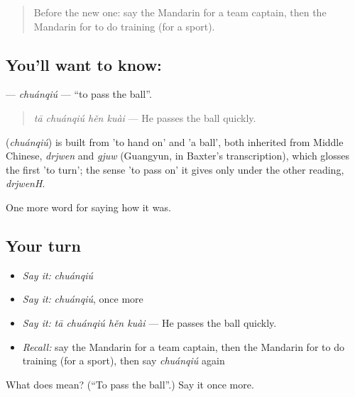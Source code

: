 \label{lesson:ZH-C499-chuanqiu}



\begin{quote}
Before the new one: say the Mandarin for a team captain, then the Mandarin for to do training (for a sport).
\end{quote}

\subsection*{You'll want to know: }
\textbf{} — \emph{chuánqiú} — \textquotedblleft{}to pass the ball\textquotedblright{}.

\begin{quote}
\textbf{} \emph{tā chuánqiú hěn kuài} — He passes the ball quickly.
\end{quote}

\begin{cousinweb}
\textbf{} (\emph{chuánqiú}) is built from  'to hand on' and  'a ball', both inherited from Middle Chinese, \emph{drjwen} and \emph{gjuw} (Guangyun, in Baxter's transcription), which glosses the first 'to turn'; the sense 'to pass on' it gives only under the other reading, \emph{drjwenH}.
\end{cousinweb}

\begin{grammarlens}[title={What you've built}]
One more word for saying how it was.
\end{grammarlens}

\subsection*{Your turn}
\begin{itemize}
\raggedright
  \item \emph{Say it:} \emph{chuánqiú}
  \item \emph{Say it:} \emph{chuánqiú}, once more
  \item \emph{Say it:} \emph{tā chuánqiú hěn kuài} — He passes the ball quickly.
  \item \emph{Recall:} say the Mandarin for a team captain, then the Mandarin for to do training (for a sport), then say \emph{chuánqiú} again
\end{itemize}

\begin{tcolorbox}[breakable,colback=teal!4,colframe=teal!35!black,title={Before you move on}]
What does  mean? (\textquotedblleft{}To pass the ball\textquotedblright{}.) Say it once more.
\end{tcolorbox}

